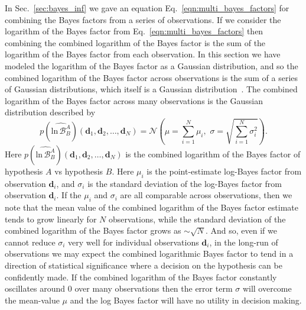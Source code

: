 In Sec.~\ref{sec:bayes_inf} we gave an equation Eq.~\ref{eqn:multi_bayes_factors} for combining the Bayes factors from a series of observations. If we consider the logarithm of the Bayes factor from Eq.~\ref{eqn:multi_bayes_factors} then combining the combined logarithm of the Bayes factor is the sum of the logarithm of the Bayes factor from each observation. In this section we have modeled the logarithm of the Bayes factor as a Gaussian distribution, and so the combined logarithm of the Bayes factor across observations is the sum of a series of Gaussian distributions, which itself is a Gaussian distribution~\cite{bromiley2003products}. The combined logarithm of the Bayes factor across many observations is the Gaussian distribution described by
\begin{equation}
    p(\widehat{\mathrm{ln} \, \mathcal{B}^A_B}) \left(\mathbf{d}_1, \mathbf{d}_2, \ldots, \mathbf{d}_N \right) = \mathcal{N}\left(\mu = \sum \limits_{i=1}^{N} \mu_i, \, \, \sigma = \sqrt{\sum \limits_{i=1}^{N} \sigma_i^2}\right).
\end{equation} 
Here $p(\widehat{\mathrm{ln} \, \mathcal{B}^A_B}) \left(\mathbf{d}_1, \mathbf{d}_2, \ldots, \mathbf{d}_N \right)$ is the combined logarithm of the Bayes factor of hypothesis $A$ vs hypothesis $B$. Here $\mu_i$ is the point-estimate log-Bayes factor from observation $\mathbf{d}_i$, and $\sigma_i$ is the standard deviation of the log-Bayes factor from observation $\mathbf{d}_i$. If the $\mu_i$ and $\sigma_i$ are all comparable across observations, then we note that the mean value of the combined logarithm of the Bayes factor estimate tends to grow linearly for $N$ observations, while the standard deviation of the combined logarithm of the Bayes factor grows as $\sim \sqrt{N}$. And so, even if we cannot reduce $\sigma_i$ very well for individual observations $\mathbf{d}_i$, in the long-run of observations we may expect the combined logarithmic Bayes factor to tend in a direction of statistical significance where a decision on the hypothesis can be confidently made. If the combined logarithm of the Bayes factor constantly oscillates around $0$ over many observations then the error term $\sigma$ will overcome the mean-value $\mu$ and the log Bayes factor will have no utility in decision making.

